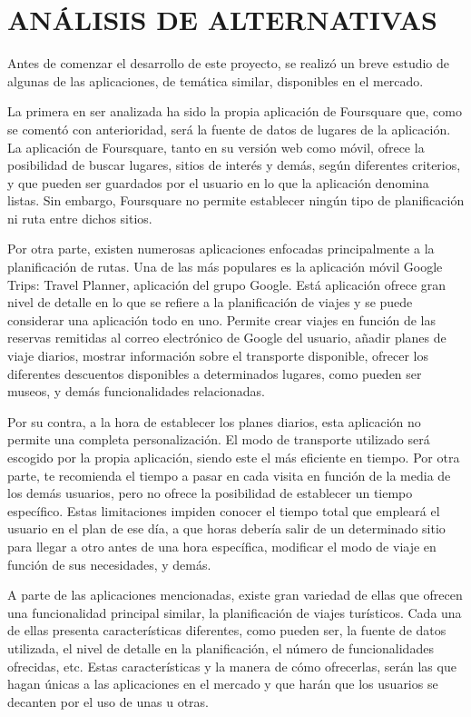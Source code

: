 \chapter[Análisis de alternativas]{
  \label{chp:analisisdealternativas}
  ANÁLISIS DE ALTERNATIVAS
}
\thispagestyle{numberingStyle}
\pagestyle{numberingStyle}



Antes de comenzar el desarrollo de este proyecto, se realizó un breve estudio de algunas de las aplicaciones, de temática similar, disponibles en el mercado. 

La primera en ser analizada ha sido la propia aplicación de Foursquare que, como se comentó con anterioridad, será la fuente de datos de lugares de la aplicación. La aplicación de Foursquare, tanto en su versión web como móvil, ofrece la posibilidad de buscar lugares, sitios de interés y demás, según diferentes criterios, y que pueden ser guardados por el usuario en lo que la aplicación denomina listas. Sin embargo, Foursquare no permite establecer ningún tipo de planificación ni ruta entre dichos sitios.

Por otra parte, existen numerosas aplicaciones enfocadas principalmente a la planificación de rutas. Una de las más populares es la aplicación móvil Google Trips: Travel Planner, aplicación del grupo Google. Está aplicación ofrece gran nivel de detalle en lo que se refiere a la planificación de viajes y se puede considerar una aplicación todo en uno. Permite crear viajes en función de las reservas remitidas al correo electrónico de Google del usuario, añadir planes de viaje diarios, mostrar información sobre el transporte disponible, ofrecer los diferentes descuentos disponibles a determinados lugares, como pueden ser museos, y demás funcionalidades relacionadas.

Por su contra, a la hora de establecer los planes diarios, esta aplicación no permite una completa personalización. El modo de transporte utilizado será escogido por la propia aplicación, siendo este el más eficiente en tiempo. Por otra parte, te recomienda el tiempo a pasar en cada visita en función de la media de los demás usuarios, pero no ofrece la posibilidad de establecer un tiempo específico. Estas limitaciones impiden conocer el tiempo total que empleará el usuario en el plan de ese día, a que horas debería salir de un determinado sitio para llegar a otro antes de una hora específica, modificar el modo de viaje en función de sus necesidades, y demás.


A parte de las aplicaciones mencionadas, existe gran variedad de ellas que ofrecen una funcionalidad principal similar, la planificación de viajes turísticos. Cada una de ellas presenta características diferentes, como pueden ser, la fuente de datos utilizada, el nivel de detalle en la planificación, el número de funcionalidades ofrecidas, etc. Estas características y la manera de cómo ofrecerlas, serán las que hagan únicas a las aplicaciones en el mercado y que harán que los usuarios se decanten por el uso de unas u otras.












